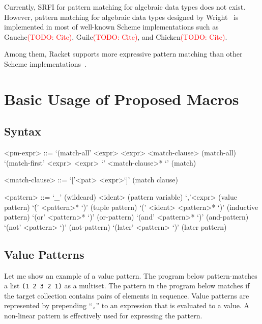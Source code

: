 \documentclass[acmlarge]{acmart}
\newcommand{\todo}[1]{\textcolor{red}{(TODO: #1)}}
\begin{document}

Currently, SRFI for pattern matching for algebraic data types does not exist.
However, pattern matching for algebraic data types designed by Wright~\cite{wright1993pattern} is implemented in most of well-known Scheme implementations such as Gauche\todo{Cite}, Guile\todo{Cite}, and Chicken\todo{Cite}.

Among them, Racket supports more expressive pattern matching than other Scheme implementations~\cite{tobin2011extensible}.


\section{Basic Usage of Proposed Macros}

\subsection{Syntax}

\begin{grammar}
<pm-expr> ::= `(match-all' <expr> <expr> <match-clause>         \hfill (match-all)
  \alt `(match-first' <expr> <expr> `{' <match-clause>* `}'      \hfill (match)

<match-clause> ::= `['<pat> <expr>`]' \hfill (match clause)

<pattern> ::= `\_'                    \hfill (wildcard)
  \alt <ident>                        \hfill (pattern variable)
  \alt `,'<expr>                      \hfill (value pattern)
  \alt `\'(' <pattern>* `)'      \hfill (tuple pattern)
  \alt `(' <ident> <pattern>* `)'     \hfill (inductive pattern)
  \alt `(or' <pattern>* `)'      \hfill (or-pattern)
  \alt `(and' <pattern>* `)'     \hfill (and-pattern)
  \alt `(not' <pattern> `)'      \hfill (not-pattern)
  \alt `(later' <pattern> `)'    \hfill (later pattern)
\end{grammar}

\subsection{Value Patterns}

Let me show an example of a value pattern.
The program below pattern-matches a list \texttt{(1 2 3 2 1)} as a multiset.
The pattern in the program below matches if the target collection contains pairs of elements in sequence.
Value patterns are represented by prepending ``\texttt{,}'' to an expression that is evaluated to a value.
A non-linear pattern is effectively used for expressing the pattern.
\end{document}
